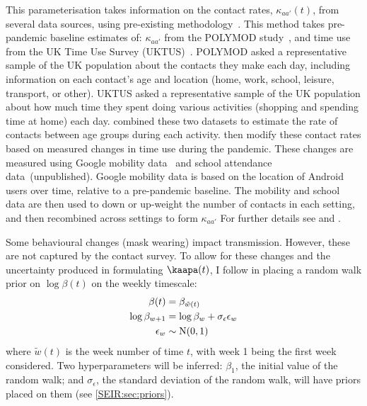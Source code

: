 \documentclass[thesis.tex]{subfiles}
\begin{document}
This parameterisation takes information on the contact rates, $\kappa_{aa'}(t)$, from several data sources, using pre-existing methodology~\autocites{vanleeuwenTime}{vanleeuwenAugmenting}.
This method takes pre-pandemic baseline estimates of: $\kappa_{aa'}$ from the POLYMOD study~\autocite{mossongSocial}, and time use from the UK Time Use Survey (UKTUS)~\autocite{UKTUS}.
POLYMOD asked a representative sample of the UK population about the contacts they make each day, including information on each contact's age and location (home, work, school, leisure, transport, or other).
UKTUS asked a representative sample of the UK population about how much time they spent doing various activities (\eg shopping and spending time at home) each day.
\Textcite{vanleeuwenAugmenting} combined these two datasets to estimate the rate of contacts between age groups during each activity.
\Textcite{birrellRealtime} then modify these contact rates based on measured changes in time use during the pandemic.
These changes are measured using Google mobility data~\autocite{googleCOVID19} and school attendance data~(unpublished).
Google mobility data is based on the location of Android users over time, relative to a pre-pandemic baseline.
The mobility and school data are then used to down or up-weight the number of contacts in each setting, and then recombined across settings to form $\kappa_{aa'}$
For further details see \textcite{vanleeuwenAugmenting} and \textcite[supplementary material]{birrellRealtime}.

Some behavioural changes (\eg mask wearing) impact transmission.
However, these are not captured by the contact survey.
To allow for these changes and the uncertainty produced in formulating $\matr{\kaapa}(t)$, I follow \textcite{birrellRealtime} in placing a random walk prior on $\log\beta(t)$  on the weekly timescale:
\begin{align}
    \beta(t) &= \beta_{\tilde{w}(t)} \\
    \log\beta_{w+1} &= \log\beta_w + \sigma_\epsilon \epsilon_w \\
    \epsilon_w &\sim \operatorname{N}(0, 1)
\end{align}
where $\tilde{w}(t)$ is the week number of time $t$, with week 1 being the first week considered.
Two hyperparameters will be inferred: $\beta_1$, the initial value of the random walk; and $\sigma_\epsilon$, the standard deviation of the random walk, will have priors placed on them (see \cref{SEIR:sec:priors}).
\end{document}
